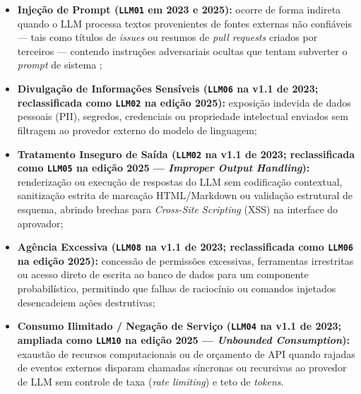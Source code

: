 \documentclass[12pt,openany,oneside,a4paper,english,brazilian,sumario=tradicional]{abntex2}
\begin{document}
\begin{itemize}
  \item \textbf{Injeção de Prompt (\texttt{LLM01} em 2023 e 2025):} ocorre de forma indireta quando o LLM processa textos provenientes de fontes externas não confiáveis — tais como títulos de \textit{issues} ou resumos de \textit{pull requests} criados por terceiros — contendo instruções adversariais ocultas que tentam subverter o \textit{prompt} de sistema \cite{greshake2023,debenedetti2024};
  \item \textbf{Divulgação de Informações Sensíveis (\texttt{LLM06} na v1.1 de 2023; reclassificada como \texttt{LLM02} na edição 2025):} exposição indevida de dados pessoais (PII), segredos, credenciais ou propriedade intelectual enviados sem filtragem ao provedor externo do modelo de linguagem;
  \item \textbf{Tratamento Inseguro de Saída (\texttt{LLM02} na v1.1 de 2023; reclassificada como \texttt{LLM05} na edição 2025 — \textit{Improper Output Handling}):} renderização ou execução de respostas do LLM sem codificação contextual, sanitização estrita de marcação HTML/Markdown ou validação estrutural de esquema, abrindo brechas para \textit{Cross-Site Scripting} (XSS) na interface do aprovador;
  \item \textbf{Agência Excessiva (\texttt{LLM08} na v1.1 de 2023; reclassificada como \texttt{LLM06} na edição 2025):} concessão de permissões excessivas, ferramentas irrestritas ou acesso direto de escrita ao banco de dados para um componente probabilístico, permitindo que falhas de raciocínio ou comandos injetados desencadeiem ações destrutivas;
  \item \textbf{Consumo Ilimitado / Negação de Serviço (\texttt{LLM04} na v1.1 de 2023; ampliada como \texttt{LLM10} na edição 2025 — \textit{Unbounded Consumption}):} exaustão de recursos computacionais ou de orçamento de API quando rajadas de eventos externos disparam chamadas síncronas ou recursivas ao provedor de LLM sem controle de taxa (\textit{rate limiting}) e teto de \textit{tokens}.
\end{itemize}
\end{document}
